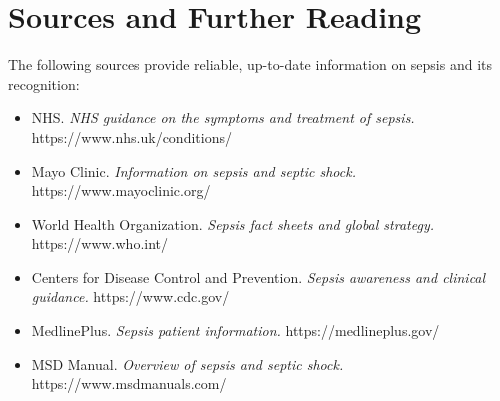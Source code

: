 \section*{Sources and Further Reading}
The following sources provide reliable, up-to-date information on sepsis and its recognition:

\begin{itemize}
    \item NHS. \textit{NHS guidance on the symptoms and treatment of sepsis.} https://www.nhs.uk/conditions/
    \item Mayo Clinic. \textit{Information on sepsis and septic shock.} https://www.mayoclinic.org/
    \item World Health Organization. \textit{Sepsis fact sheets and global strategy.} https://www.who.int/
    \item Centers for Disease Control and Prevention. \textit{Sepsis awareness and clinical guidance.} https://www.cdc.gov/
    \item MedlinePlus. \textit{Sepsis patient information.} https://medlineplus.gov/
    \item MSD Manual. \textit{Overview of sepsis and septic shock.} https://www.msdmanuals.com/
\end{itemize}
